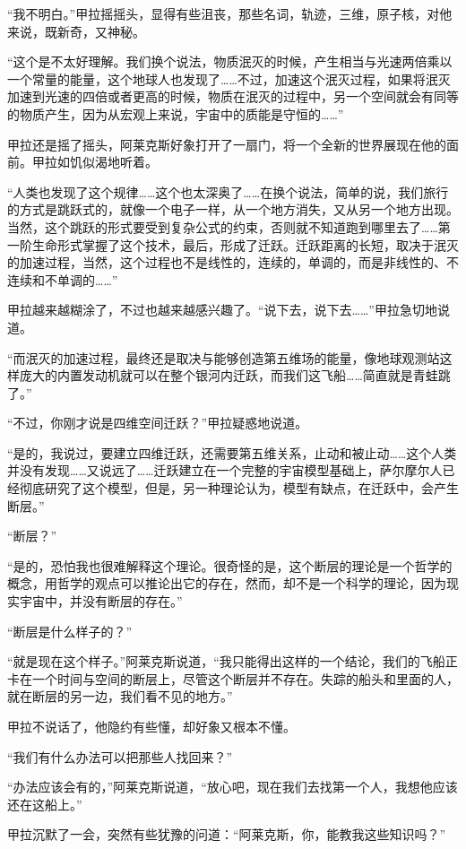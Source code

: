“我不明白。”甲拉摇摇头，显得有些沮丧，那些名词，轨迹，三维，原子核，对他来说，既新奇，又神秘。 

“这个是不太好理解。我们换个说法，物质泯灭的时候，产生相当与光速两倍乘以一个常量的能量，这个地球人也发现了……不过，加速这个泯灭过程，如果将泯灭加速到光速的四倍或者更高的时候，物质在泯灭的过程中，另一个空间就会有同等的物质产生，因为从宏观上来说，宇宙中的质能是守恒的……” 

甲拉还是摇了摇头，阿莱克斯好象打开了一扇门，将一个全新的世界展现在他的面前。甲拉如饥似渴地听着。 

“人类也发现了这个规律……这个也太深奥了……在换个说法，简单的说，我们旅行的方式是跳跃式的，就像一个电子一样，从一个地方消失，又从另一个地方出现。当然，这个跳跃的形式要受到复杂公式的约束，否则就不知道跑到哪里去了……第一阶生命形式掌握了这个技术，最后，形成了迁跃。迁跃距离的长短，取决于泯灭的加速过程，当然，这个过程也不是线性的，连续的，单调的，而是非线性的、不连续和不单调的……” 

甲拉越来越糊涂了，不过也越来越感兴趣了。“说下去，说下去……”甲拉急切地说道。 

“而泯灭的加速过程，最终还是取决与能够创造第五维场的能量，像地球观测站这样庞大的内置发动机就可以在整个银河内迁跃，而我们这飞船……简直就是青蛙跳了。” 

“不过，你刚才说是四维空间迁跃？”甲拉疑惑地说道。 

“是的，我说过，要建立四维迁跃，还需要第五维关系，止动和被止动……这个人类并没有发现……又说远了……迁跃建立在一个完整的宇宙模型基础上，萨尔摩尔人已经彻底研究了这个模型，但是，另一种理论认为，模型有缺点，在迁跃中，会产生断层。” 

“断层？” 

“是的，恐怕我也很难解释这个理论。很奇怪的是，这个断层的理论是一个哲学的概念，用哲学的观点可以推论出它的存在，然而，却不是一个科学的理论，因为现实宇宙中，并没有断层的存在。” 

“断层是什么样子的？” 

“就是现在这个样子。”阿莱克斯说道，“我只能得出这样的一个结论，我们的飞船正卡在一个时间与空间的断层上，尽管这个断层并不存在。失踪的船头和里面的人，就在断层的另一边，我们看不见的地方。” 

甲拉不说话了，他隐约有些懂，却好象又根本不懂。 

“我们有什么办法可以把那些人找回来？” 

“办法应该会有的，”阿莱克斯说道，“放心吧，现在我们去找第一个人，我想他应该还在这船上。” 

甲拉沉默了一会，突然有些犹豫的问道：“阿莱克斯，你，能教我这些知识吗？” 

